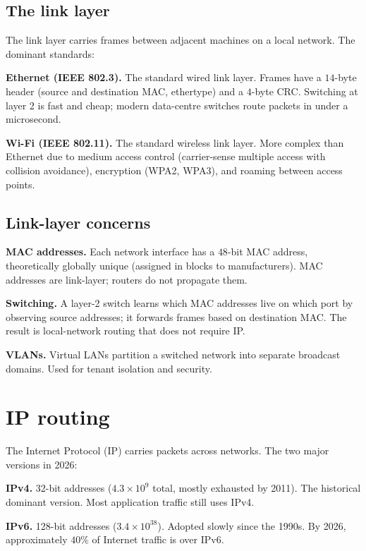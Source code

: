 \subsection{The link layer}

The link layer carries frames between adjacent machines on a local network. The dominant standards:

\textbf{Ethernet (IEEE 802.3).} The standard wired link layer. Frames have a $14$-byte header (source and destination MAC, ethertype) and a $4$-byte CRC. Switching at layer 2 is fast and cheap; modern data-centre switches route packets in under a microsecond.

\textbf{Wi-Fi (IEEE 802.11).} The standard wireless link layer. More complex than Ethernet due to medium access control (carrier-sense multiple access with collision avoidance), encryption (WPA2, WPA3), and roaming between access points.

\subsection{Link-layer concerns}

\textbf{MAC addresses.} Each network interface has a $48$-bit MAC address, theoretically globally unique (assigned in blocks to manufacturers). MAC addresses are link-layer; routers do not propagate them.

\textbf{Switching.} A layer-2 switch learns which MAC addresses live on which port by observing source addresses; it forwards frames based on destination MAC. The result is local-network routing that does not require IP.

\textbf{VLANs.} Virtual LANs partition a switched network into separate broadcast domains. Used for tenant isolation and security.

\section{IP routing}

The Internet Protocol (IP) carries packets across networks. The two major versions in 2026:

\textbf{IPv4.} 32-bit addresses ($4.3 \times 10^9$ total, mostly exhausted by 2011). The historical dominant version. Most application traffic still uses IPv4.

\textbf{IPv6.} 128-bit addresses ($3.4 \times 10^{38}$). Adopted slowly since the 1990s. By 2026, approximately $40\%$ of Internet traffic is over IPv6.

